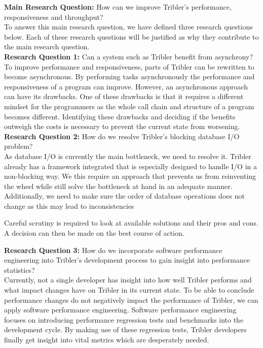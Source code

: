\textbf{Main Research Question:} How can we improve Tribler's performance, responsiveness and throughput?\\

To answer this main research question, we have defined three research questions below. Each of these research questions will be justified as why they contribute to the main research question.\\

\textbf{Research Question 1:} Can a system such as Tribler benefit from asynchrony?\\

To improve performance and responsiveness, parts of Tribler can be rewritten to become asynchronous.
By performing tasks asynchronously the performance and responsiveness of a program can improve.
However, an asynchronous approach can have its drawbacks. 
One of these drawbacks is that it requires a different mindset for the programmers as the whole call chain and structure of a program becomes different.
Identifying these drawbacks and deciding if the benefits outweigh the costs is necessary to prevent the current state from worsening. \\

\noindent
\textbf{Research Question 2:} How do we resolve Tribler's blocking database I/O problem?\\

As database I/O is currently the main bottleneck, we need to resolve it.
Tribler already has a framework integrated that is especially designed to handle I/O in a non-blocking way.
We this require an approach that prevents us from reinventing the wheel while still solve the bottleneck at hand in an adequate manner.
Additionally, we need to make sure the order of database operations does not change as this may lead to inconsistencies

Careful scrutiny is required to look at available solutions and their pros and cons.
A decision can then be made on the best course of action. 

\noindent
\textbf{Research Question 3:} How do we incorporate software performance engineering into Tribler's development process to gain insight into performance statistics?\\

Currently, not a single developer has insight into how well Tribler performs and what impact changes have on Tribler in its current state.
To be able to conclude performance changes do not negatively impact the performance of Tribler, we can apply software performance engineering.
Software performance engineering focuses on introducing performance regression tests and benchmarks into the development cycle.
By making use of these regression tests, Tribler developers finally get insight into vital metrics which are desperately needed.\\



